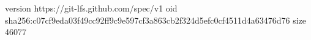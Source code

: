 version https://git-lfs.github.com/spec/v1
oid sha256:c07cf9eda03f49cc92ff9c9e597cf3a863cb2f324d5efc0cf4511d4a63476d76
size 46077
